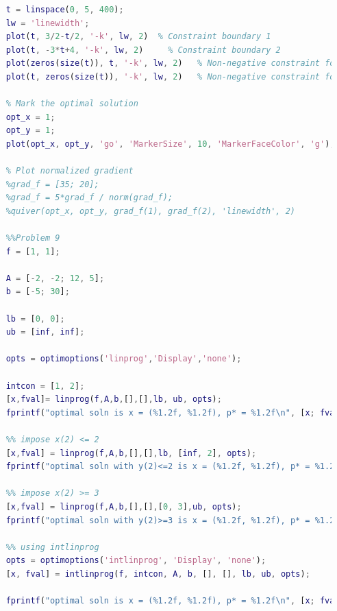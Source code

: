 \documentclass[12pt]{article}
\begin{document}
\begin{lstlisting}[language=Matlab, basicstyle=\scriptsize]
    % Plot boundary of feasible region
    t = linspace(0, 5, 400);
    lw = 'linewidth';
    plot(t, 3/2-t/2, '-k', lw, 2)  % Constraint boundary 1
    plot(t, -3*t+4, '-k', lw, 2)     % Constraint boundary 2
    plot(zeros(size(t)), t, '-k', lw, 2)   % Non-negative constraint for x
    plot(t, zeros(size(t)), '-k', lw, 2)   % Non-negative constraint for y
    
    % Mark the optimal solution
    opt_x = 1;
    opt_y = 1;
    plot(opt_x, opt_y, 'go', 'MarkerSize', 10, 'MarkerFaceColor', 'g');
    
    % Plot normalized gradient
    %grad_f = [35; 20];
    %grad_f = 5*grad_f / norm(grad_f);
    %quiver(opt_x, opt_y, grad_f(1), grad_f(2), 'linewidth', 2)
    
    %%Problem 9
    f = [1, 1];
    
    A = [-2, -2; 12, 5];
    b = [-5; 30];
    
    lb = [0, 0];
    ub = [inf, inf];
    
    opts = optimoptions('linprog','Display','none');
    
    intcon = [1, 2];
    [x,fval]= linprog(f,A,b,[],[],lb, ub, opts);
    fprintf("optimal soln is x = (%1.2f, %1.2f), p* = %1.2f\n", [x; fval]) 
    
    %% impose x(2) <= 2
    [x,fval] = linprog(f,A,b,[],[],lb, [inf, 2], opts);
    fprintf("optimal soln with y(2)<=2 is x = (%1.2f, %1.2f), p* = %1.2f\n", [x; fval]) 
    
    %% impose x(2) >= 3
    [x,fval] = linprog(f,A,b,[],[],[0, 3],ub, opts);
    fprintf("optimal soln with y(2)>=3 is x = (%1.2f, %1.2f), p* = %1.2f\n", [x; fval]) 
    
    %% using intlinprog
    opts = optimoptions('intlinprog', 'Display', 'none');
    [x, fval] = intlinprog(f, intcon, A, b, [], [], lb, ub, opts);
    
    fprintf("optimal soln is x = (%1.2f, %1.2f), p* = %1.2f\n", [x; fval]) 
    
\end{lstlisting}
\end{document}
